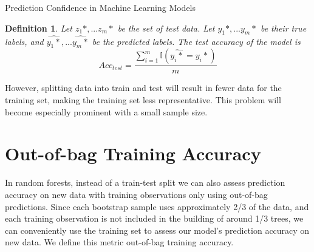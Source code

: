 \documentclass[12pt]{pom_thesis}
\newtheorem{definition}{Definition}[section]
\begin{document}
\begin{chapter}{Prediction Confidence in Machine Learning Models}
\begin{definition}
Let $z_1*,...z_m*$ be the set of test data. Let $y_1*,...y_m*$ be their true labels, and $\hat{y_1*},...\hat{y_m*}$ be the predicted labels. The test accuracy of the model is
\begin{equation}
\label{acc_test}
    Acc_{test}=\frac{\sum_{i=1}^m \mathbb{I}(\hat{y_i*}=y_i*)}{m}
\end{equation}
\end{definition}




However, splitting data into train and test will result in fewer data for the training set, making the training set less representative. This problem will become especially prominent with a small sample size. 

\section{Out-of-bag Training Accuracy}
In random forests, instead of a train-test split we can also assess prediction accuracy on new data with training observations only using out-of-bag predictions. Since each bootstrap sample uses approximately 2/3 of the data, and each training observation is not included in the building of around 1/3 trees, we can conveniently use the training set to assess our model's prediction accuracy on new data. We define this metric out-of-bag training accuracy.


\end{chapter}
\end{document}
